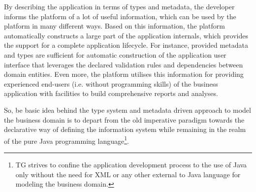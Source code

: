   By describing the application in terms of types and metadata, the developer informs the platform of a lot of useful information, which can be used by the platform in many different ways.
  Based on this information, the platform automatically constructs a large part of the application internals, which provides the support for a complete application lifecycle.
  For instance, provided metadata and types are sufficient for automatic construction of the application user interface that leverages the declared validation rules and dependencies between domain entities.
  Even more, the platform utilises this information for providing experienced end-users (i.e. without programming skills) of the business application with facilities to build comprehensive reports and analyses.

  So, be basic idea behind the type system and metadata driven approach to model the business domain is to depart from the old imperative paradigm towards the declarative way of defining the information system while remaining in the realm of the pure Java programming language\footnote{TG strives to confine the application development process to the use of Java only without the need for XML or any other external to Java language for modeling the business domain.}.
  
  



 